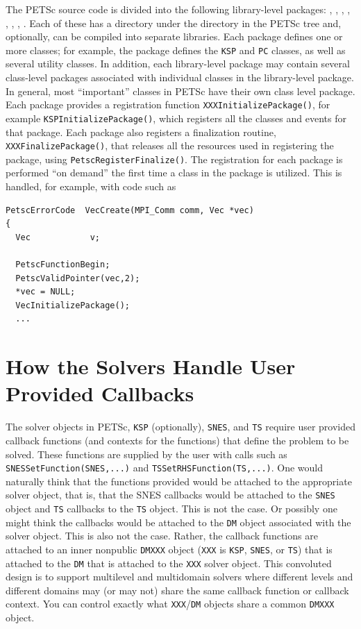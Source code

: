 The PETSc source code is divided into the following library-level
packages: , , , , , , , . Each
of these has a directory under the  directory in the PETSc
tree and, optionally, can be compiled into separate libraries. Each
package defines one or more classes; for example, the 
package defines the \lstinline{KSP} and \lstinline{PC} classes, as
well as several utility classes. In addition, each library-level
package may contain several class-level packages associated with
individual classes in the library-level package. In general, most
``important'' classes in PETSc have their own class level package.
Each package provides a registration
function \lstinline{XXXInitializePackage()}, for
example \lstinline{KSPInitializePackage()}, which registers all the
classes and events for that package. Each package also registers a finalization
routine, \lstinline{XXXFinalizePackage()}, that releases all the
resources used in registering the package,
using \lstinline{PetscRegisterFinalize()}. The registration for each
package is performed ``on demand'' the first time a class in the
package is utilized. This is handled, for example, with code such
as
\begin{lstlisting}
PetscErrorCode  VecCreate(MPI_Comm comm, Vec *vec)
{
  Vec            v;

  PetscFunctionBegin;
  PetscValidPointer(vec,2);
  *vec = NULL;
  VecInitializePackage();
  ...
\end{lstlisting}


\chapter{How the Solvers Handle User Provided Callbacks}
\label{sec:dmksp}

The solver objects in PETSc, \lstinline{KSP} (optionally), \lstinline{SNES}, and
\lstinline{TS} require user provided callback functions (and contexts for the
functions) that define the problem to be solved. These functions are supplied by
the user with calls such as \lstinline{SNESSetFunction(SNES,...)}
and \lstinline{TSSetRHSFunction(TS,...)}. One would naturally think
that the functions provided would be attached to the appropriate
solver object, that is, that the SNES callbacks would be attached to the
\lstinline{SNES} object and \lstinline{TS} callbacks to the \lstinline{TS} object. This is not the
case. Or possibly one might think the callbacks would be attached to
the \lstinline{DM} object associated with the solver object. This is also not the
case. Rather, the callback functions are attached to an inner nonpublic \lstinline{DMXXX} object
(\lstinline{XXX} is \lstinline{KSP}, \lstinline{SNES}, or \lstinline{TS}) that is attached to the \lstinline{DM} that is attached
to the \lstinline{XXX} solver object. This convoluted design is to support
multilevel and multidomain solvers where different levels and
different domains may (or may not) share the same callback function or callback context.
You can control exactly what \lstinline{XXX}/\lstinline{DM} objects share a common \lstinline{DMXXX} object.

